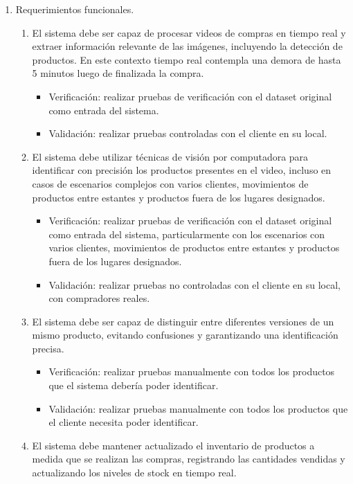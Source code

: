 \documentclass[
11pt, %
]{charter}
\begin{document}
\begin{enumerate}
\item Requerimientos funcionales.
\begin{enumerate}
\item El sistema debe ser capaz de procesar videos de compras en tiempo real y extraer información relevante de las imágenes, incluyendo la detección de productos. En este contexto tiempo real contempla una demora de hasta 5 minutos luego de finalizada la compra.
			\begin{itemize}
	\item Verificación: realizar pruebas de verificación con el dataset original como entrada del sistema.
	\item Validación: realizar pruebas controladas con el cliente en su local.   
\end{itemize}
			\item El sistema debe utilizar técnicas de visión por computadora para identificar con precisión los productos presentes en el video, incluso en casos de escenarios complejos con varios clientes, movimientos de productos entre estantes y productos fuera de los lugares designados.
			\begin{itemize}
		\item Verificación: realizar pruebas de verificación con el dataset original como entrada del sistema, particularmente con los escenarios con varios clientes, movimientos de productos entre estantes y productos fuera de los lugares designados.
	\item Validación: realizar pruebas no controladas con el cliente en su local, con compradores reales.
\end{itemize}
			\item El sistema debe ser capaz de distinguir entre diferentes versiones de un mismo producto, evitando confusiones y garantizando una identificación precisa.
			\begin{itemize}
	\item Verificación: realizar pruebas manualmente con todos los productos que el sistema debería poder identificar.
	\item Validación: realizar pruebas manualmente con todos los productos que el cliente necesita poder identificar.
\end{itemize}
			\item El sistema debe mantener actualizado el inventario de productos a medida que se realizan las compras, registrando las cantidades vendidas y actualizando los niveles de stock en tiempo real.

\end{enumerate}
\end{enumerate}
\end{document}
